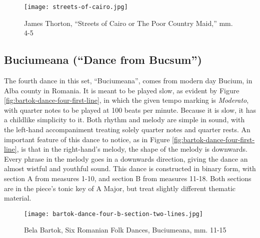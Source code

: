 \begin{figure}
  \centering
  \texttt{[image: streets-of-cairo.jpg]}
  \caption{James Thorton, ``Streets of Cairo or The Poor Country Maid,'' mm. 4-5}
  \label{fig:thorton-streets-of-cairo}
\end{figure}



\subsection{Buciumeana (``Dance from Bucsum'')}

The fourth dance in this set, ``Buciumeana'', comes from modern day Bucium, in Alba county in Romania. It is meant to be played slow, as evident by Figure \ref{fig:bartok-dance-four-first-line}\autocite{Lung_2016}, in which the given tempo marking is \textit{Moderato}, with quarter notes to be played at 100 beats per minute. Because it is slow, it has a childlike simplicity to it. Both rhythm and melody are simple in sound, with the left-hand accompaniment treating solely quarter notes and quarter rests. An important feature of this dance to notice, as in Figure \ref{fig:bartok-dance-four-first-line}\autocite{Lung_2016}, is that in the right-hand's melody, the shape of the melody is downwards. Every phrase in the melody goes in a downwards direction, giving the dance an almost wistful and youthful sound. This dance is constructed in binary form, with section A from measures 1-10, and section B from measures 11-18. Both sections are in the piece's tonic key of A Major, but treat slightly different thematic material. 

\begin{figure}
  \centering
  \texttt{[image: bartok-dance-four-b-section-two-lines.jpg]}
  \caption{Bela Bartok, Six Romanian Folk Dances, Buciumeana, mm. 11-15}
  \label{fig:bartok-dance-four-b-section-two-lines}
\end{figure}

